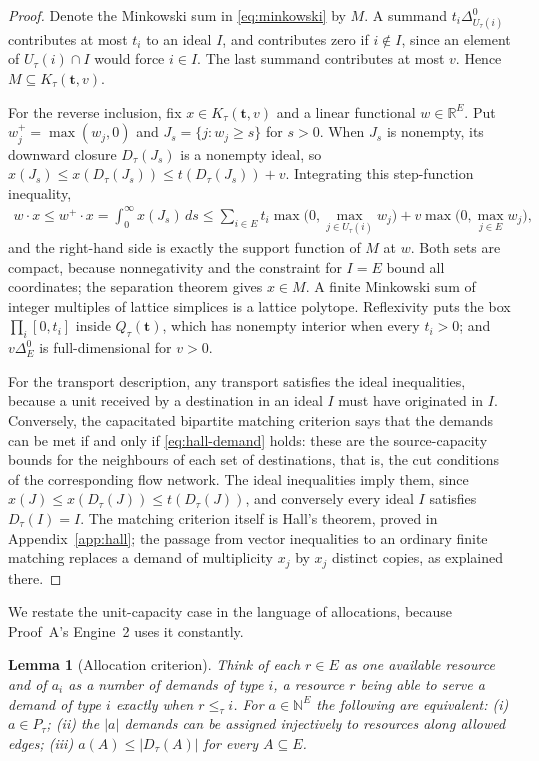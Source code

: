 \documentclass[11pt]{article}
\numberwithin{equation}{section}
\newtheorem{lemma}[theorem]{Lemma}
\theoremstyle{definition}
\theoremstyle{remark}
\newcommand{\N}{\mathbb N}
\newcommand{\R}{\mathbb R}
\newcommand{\Dz}[1]{\Delta^{0}_{#1}}
\begin{document}
\begin{proof}
Denote the Minkowski sum in \eqref{eq:minkowski} by $M$. A summand
$t_i\Dz{U_\tau(i)}$ contributes at most $t_i$ to an ideal $I$, and contributes
zero if $i\notin I$, since an element of $U_\tau(i)\cap I$ would force
$i\in I$. The last summand contributes at most $v$. Hence
$M\subseteq K_\tau(\mathbf t,v)$.

For the reverse inclusion, fix $x\in K_\tau(\mathbf t,v)$ and a linear
functional $w\in\R^E$. Put $w^+_j=\max(w_j,0)$ and $J_s=\{j:w_j\ge s\}$ for
$s>0$. When $J_s$ is nonempty, its downward closure $D_\tau(J_s)$ is a
nonempty ideal, so $x(J_s)\le x(D_\tau(J_s))\le t(D_\tau(J_s))+v$.
Integrating this step-function inequality,
\begin{align*}
 w\cdot x\le w^+\cdot x=\int_0^\infty x(J_s)\,ds
 \le\sum_{i\in E}t_i\max\bigl(0,\max_{j\in U_\tau(i)}w_j\bigr)
       +v\max\bigl(0,\max_{j\in E}w_j\bigr),
\end{align*}
and the right-hand side is exactly the support function of $M$ at $w$. Both
sets are compact, because nonnegativity and the constraint for $I=E$ bound
all coordinates; the separation theorem gives $x\in M$. A finite Minkowski
sum of integer multiples of lattice simplices is a lattice polytope.
Reflexivity puts the box $\prod_i[0,t_i]$ inside $Q_\tau(\mathbf t)$, which
has nonempty interior when every $t_i>0$; and $v\Dz E$ is full-dimensional
for $v>0$.

For the transport description, any transport satisfies the ideal
inequalities, because a unit received by a destination in an ideal $I$ must
have originated in $I$. Conversely, the capacitated bipartite matching
criterion says that the demands can be met if and only if
\eqref{eq:hall-demand} holds: these are the source-capacity bounds for the
neighbours of each set of destinations, that is, the cut conditions of the
corresponding flow network. The ideal inequalities imply them, since
$x(J)\le x(D_\tau(J))\le t(D_\tau(J))$, and conversely every ideal $I$
satisfies $D_\tau(I)=I$. The matching criterion itself is Hall's theorem,
proved in Appendix~\ref{app:hall}; the passage from vector inequalities to an
ordinary finite matching replaces a demand of multiplicity $x_j$ by $x_j$
distinct copies, as explained there.
\end{proof}

We restate the unit-capacity case in the language of allocations, because
Proof~A's Engine~2 uses it constantly.

\begin{lemma}[Allocation criterion]
\label{lem:allocation}
Think of each $r\in E$ as one available resource and of $a_i$ as a number of
demands of type $i$, a resource $r$ being able to serve a demand of type $i$
exactly when $r\le_\tau i$. For $a\in\N^E$ the following are equivalent:
\emph{(i)} $a\in P_\tau$; \emph{(ii)} the $|a|$ demands can be assigned
injectively to resources along allowed edges; \emph{(iii)}
$a(A)\le|D_\tau(A)|$ for every $A\subseteq E$.
\end{lemma}
\end{document}
